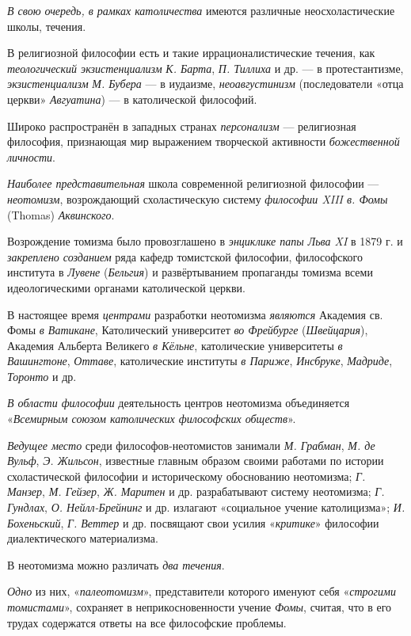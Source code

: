 \documentclass[a4paper,14pt,russian]{extreport}
\begin{document}
\emph{В свою очередь, в рамках католичества} имеются различные неосхоластические школы, течения.

В религиозной философии есть и такие иррационалистические течения, как \emph{теологический экзистенциализм} \emph{К. Барта}, \emph{П. Тиллиха} и др. --- в протестантизме, \emph{экзистенциализм} \emph{М. Бубера} --- в иудаизме, \emph{неоавгустинизм} (последователи «отца церкви» \emph{Авгуатина}) --- в католической философий.

Широко распространён в западных странах \emph{персонализм} --- религиозная философия, признающая мир выражением творческой активности \emph{божественной личности}.

\emph{Наиболее представительная} школа современной религиозной философии --- \emph{неотомизм}, возрождающий схоластическую систему \emph{философии XIII в. Фомы} (Thomas) \emph{Аквинского}.

Возрождение томизма было провозглашено в \emph{энциклике папы Льва XI} в 1879 г. и \emph{закреплено созданием} ряда кафедр томистской философии, философского института в \emph{Лувене} (\emph{Бельгия}) и развёртыванием пропаганды томизма всеми идеологическими органами католической церкви.

В настоящее время \emph{центрами} разработки неотомизма \emph{являются} Академия св. Фомы \emph{в Ватикане}, Католический университет \emph{во Фрейбурге} (\emph{Швейцария}), Академия Альберта Великего \emph{в Кёльне}, католические университеты \emph{в Вашингтоне}, \emph{Оттаве}, католические институты \emph{в Париже}, \emph{Инсбруке}, \emph{Мадриде}, \emph{Торонто} и др.

\emph{В области философии} деятельность центров неотомизма объединяется «\emph{Всемирным союзом католических философских обществ}».

\emph{Ведущее место} среди философов-неотомистов занимали \emph{М. Грабман}, \emph{М. де Вульф}, \emph{Э. Жильсон}, известные главным образом своими работами по истории схоластической философии и историческому обоснованию неотомизма; \emph{Г. Манзер}, \emph{М. Гейзер}, \emph{Ж. Маритен} и др. разрабатывают систему неотомизма; \emph{Г. Гундлах}, \emph{О. Нейлл-Брейнинг} и др. излагают «социальное учение католицизма»; \emph{И. Бохеньский}, \emph{Г. Веттер} и др. посвящают свои усилия «\emph{критике}» философии диалектического материализма.

В неотомизма можно различать \emph{два течения}.

\emph{Одно} из них, «\emph{палеотомизм}», представители которого именуют себя «\emph{строгими томистами}», сохраняет в неприкосновенности учение \emph{Фомы}, считая, что в его трудах содержатся ответы на все философские проблемы.
\end{document}
